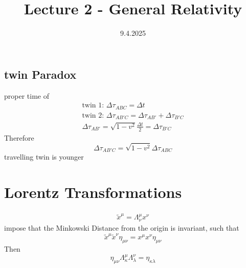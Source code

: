 \documentclass[]{scrartcl}
\title{Lecture 2 - General Relativity}
\author{}
\date{9.4.2025}
\begin{document}
\maketitle
\newpage
\tableofcontents
\newpage

\subsection{twin Paradox} 
proper time of
\begin{gather}
	\text{twin 1: } \Delta \tau_{ABC} = \Delta t\\
	\text{twin 2: } \Delta\tau_{AB'C} = \Delta\tau_{AB'} + \Delta\tau_{B'C}\\
	\Delta\tau_{AB'} = \sqrt{1-v^2} \frac{\Delta t}{2} = \Delta\tau_{B'C}
\end{gather}
Therefore
\begin{equation}
	\Delta\tau_{AB'C} = \sqrt{1-v^2}\Delta\tau_{ABC}
\end{equation}
travelling twin is younger


\section{Lorentz Transformations}

\begin{gather}
	\tilde x^\mu = \Lambda^\mu_\nu x^\nu
\end{gather}
impose that the Minkowski Distance from the origin is invariant, such that
\begin{equation}
	\tilde x^\mu \tilde x^\nu \eta_{\mu\nu} = x^\mu x^\nu \eta_{\mu\nu}
\end{equation}
Then
\begin{equation}
	\eta_{\mu\nu} \Lambda^\mu_\kappa \Lambda^\nu_\lambda = \eta_{\kappa\lambda}
\end{equation}
\end{document}
